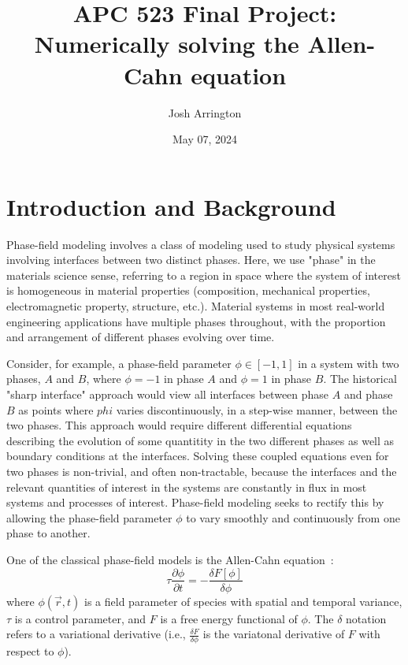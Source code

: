 \documentclass[12pt]{article}
\title{APC 523 Final Project: Numerically solving the Allen-Cahn equation}
\author{Josh Arrington}
\date{May 07, 2024}
\begin{document}
\maketitle

\section{Introduction and Background}
Phase-field modeling involves a class of modeling used to study physical systems involving interfaces between two distinct phases.
Here, we use "phase" in the materials science sense, referring to a region in space where the system of interest is homogeneous in material properties (composition, mechanical properties, electromagnetic property, structure, etc.).
Material systems in most real-world engineering applications have multiple phases throughout, with the proportion and arrangement of different phases evolving over time.

Consider, for example, a phase-field parameter $\phi\in[-1, 1]$ in a system with two phases, $A$ and $B$, where $\phi=-1$ in phase $A$ and $\phi=1$ in phase $B$.
The historical "sharp interface" approach would view all interfaces between phase $A$ and phase $B$ as points where $phi$ varies discontinuously, in a step-wise manner, between the two phases.
This approach would require different differential equations describing the evolution of some quantitity in the two different phases as well as boundary conditions at the interfaces.
Solving these coupled equations even for two phases is non-trivial, and often non-tractable, because the interfaces and the relevant quantities of interest in the systems are constantly in flux in most systems and processes of interest.
Phase-field modeling seeks to rectify this by allowing the phase-field parameter $\phi$ to vary smoothly and continuously from one phase to another.

One of the classical phase-field models is the Allen-Cahn equation~\cite{allen1972ground,allen1973correction}:
\begin{equation}
    \tau \frac{\partial \phi}{\partial t} = -\frac{\delta F[\phi]}{\delta \phi} \label{eq:allen-cahn}
\end{equation}
where $\phi(\overrightarrow{r}, t)$ is a field parameter of species with spatial and temporal variance, $\tau$ is a control parameter, and $F$ is a free energy functional of $\phi$. The $\delta$ notation refers to a variational derivative (i.e., $\frac{\delta F}{\delta \phi}$ is the variatonal derivative of $F$ with respect to $\phi$).
\end{document}
